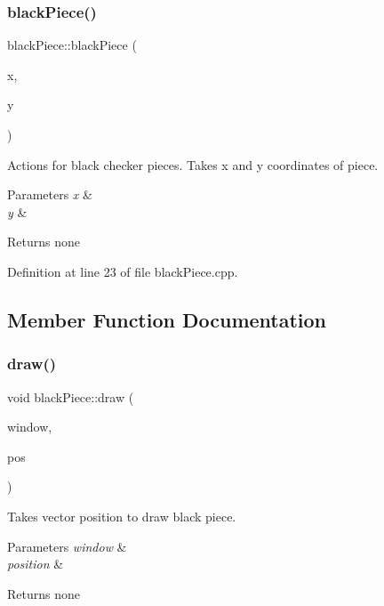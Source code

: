 \subsubsection{\texorpdfstring{blackPiece()}{blackPiece()}}
{\footnotesize\ttfamily black\+Piece\+::black\+Piece (\begin{DoxyParamCaption}\item[{int}]{x,  }\item[{int}]{y }\end{DoxyParamCaption})}

Actions for black checker pieces. Takes x and y coordinates of piece.


\begin{DoxyParams}{Parameters}
{\em x} & \\
\hline
{\em y} & \\
\hline
\end{DoxyParams}
\begin{DoxyReturn}{Returns}
none 
\end{DoxyReturn}


Definition at line 23 of file black\+Piece.\+cpp.



\subsection{Member Function Documentation}
\mbox{\label{classblack_piece_ab73b4c4c5da2cd1571610deb79eaa9db}} 
\subsubsection{\texorpdfstring{draw()}{draw()}}
{\footnotesize\ttfamily void black\+Piece\+::draw (\begin{DoxyParamCaption}\item[{sf\+::\+Render\+Window \&}]{window,  }\item[{sf\+::\+Vector2f}]{pos }\end{DoxyParamCaption})}

Takes vector position to draw black piece.


\begin{DoxyParams}{Parameters}
{\em window} & \\
\hline
{\em position} & \\
\hline
\end{DoxyParams}
\begin{DoxyReturn}{Returns}
none 
\end{DoxyReturn}


